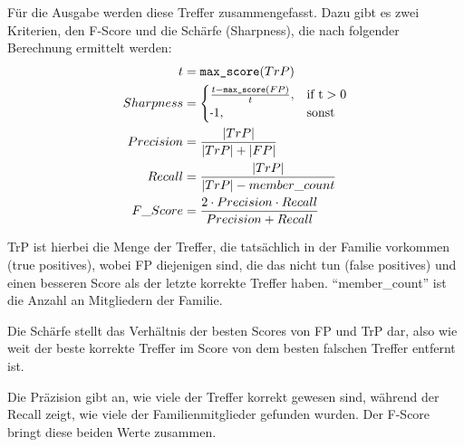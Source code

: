 \begin{enumerate}[a)]
            Für die Ausgabe werden diese Treffer zusammengefasst. Dazu gibt es zwei Kriterien, den F-Score und die Schärfe (Sharpness), die nach folgender Berechnung ermittelt werden:
            \begin{equation}
                \begin{split}
                    t & = \texttt{max\_score}(TrP)\\
                    Sharpness & = \begin{cases}
                                      \frac{t-\texttt{max\_score}(FP)}{t},& \text{if t} > 0\\
                                      \sminus 1,& \text{sonst}
                                  \end{cases}\\
                    Precision & = \frac{|TrP|}{|TrP|+|FP|}\\
                    Recall & = \frac{|TrP|}{|TrP|-member\_count}\\
                    F\_Score & = \frac{2 \cdot Precision \cdot Recall}{Precision + Recall}
                \end{split}
            \end{equation}

            TrP ist hierbei die Menge der Treffer, die tatsächlich in der Familie vorkommen (true positives), wobei FP diejenigen sind, die das nicht tun (false positives) und einen besseren Score als der letzte korrekte Treffer haben. ``member\_count'' ist die Anzahl an Mitgliedern der Familie.

            Die Schärfe stellt das Verhältnis der besten Scores von FP und TrP dar, also wie weit der beste korrekte Treffer im Score von dem besten falschen Treffer entfernt ist.

            Die Präzision gibt an, wie viele der Treffer korrekt gewesen sind, während der Recall zeigt, wie viele der Familienmitglieder gefunden wurden. Der F-Score bringt diese beiden Werte zusammen.


\end{enumerate}
